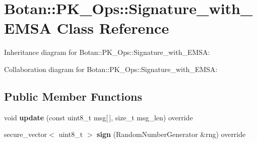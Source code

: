 \hypertarget{class_botan_1_1_p_k___ops_1_1_signature__with___e_m_s_a}{}\section{Botan\+:\+:P\+K\+\_\+\+Ops\+:\+:Signature\+\_\+with\+\_\+\+E\+M\+SA Class Reference}
\label{class_botan_1_1_p_k___ops_1_1_signature__with___e_m_s_a}


Inheritance diagram for Botan\+:\+:P\+K\+\_\+\+Ops\+:\+:Signature\+\_\+with\+\_\+\+E\+M\+SA\+:


Collaboration diagram for Botan\+:\+:P\+K\+\_\+\+Ops\+:\+:Signature\+\_\+with\+\_\+\+E\+M\+SA\+:
\subsection*{Public Member Functions}
\begin{DoxyCompactItemize}
\item 
\mbox{\label{class_botan_1_1_p_k___ops_1_1_signature__with___e_m_s_a_ac0916e79543e77a8fc9ad9691ac3a634}} 
void {\bfseries update} (const uint8\+\_\+t msg\mbox{[}$\,$\mbox{]}, size\+\_\+t msg\+\_\+len) override
\item 
\mbox{\label{class_botan_1_1_p_k___ops_1_1_signature__with___e_m_s_a_ae001f499c1f40021a9d7c64b8d863e9e}} 
secure\+\_\+vector$<$ uint8\+\_\+t $>$ {\bfseries sign} (Random\+Number\+Generator \&rng) override
\end{DoxyCompactItemize}
